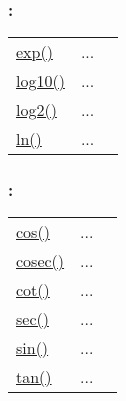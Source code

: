 \subsubsection*{: }

\textcolor{blue}{}\begin{tabular}{>{\raggedleft}p{3cm}>{\centering}p{0.5cm}l}
\textcolor{blue}{\hyperlink{exp}{exp()}}&
...&
 \begin{NoHyper} \nameref{par:Exponential-function} \end{NoHyper}\tabularnewline
\textcolor{blue}{\hyperlink{log10}{log10()}}&
...&
 \begin{NoHyper} \nameref{par:Decimal-logarithm} \end{NoHyper}\tabularnewline
\textcolor{blue}{\hyperlink{log2}{log2()}}&
...&
 \begin{NoHyper} \nameref{par:Binary-logarithm} \end{NoHyper}\tabularnewline
\textcolor{blue}{\hyperlink{ln}{ln()}}&
...&
 \begin{NoHyper} \nameref{par:Natural-logarithm} \end{NoHyper}\tabularnewline
\end{tabular}


\subsubsection*{: }

\textcolor{blue}{}\begin{tabular}{>{\raggedleft}p{3cm}>{\centering}p{0.5cm}l}
\textcolor{blue}{\hyperlink{cos}{cos()}}&
...&
 \begin{NoHyper} \nameref{par:Cosine} \end{NoHyper}\tabularnewline
\textcolor{blue}{\hyperlink{cosec}{cosec()}}&
...&
 \begin{NoHyper} \nameref{par:Cosecant} \end{NoHyper}\tabularnewline
\textcolor{blue}{\hyperlink{cot}{cot()}}&
...&
 \begin{NoHyper} \nameref{par:Cotangent} \end{NoHyper}\tabularnewline
\textcolor{blue}{\hyperlink{sec}{sec()}}&
...&
 \begin{NoHyper} \nameref{par:Secant} \end{NoHyper}\tabularnewline
\textcolor{blue}{\hyperlink{sin}{sin()}}&
...&
 \begin{NoHyper} \nameref{par:Sine} \end{NoHyper}\tabularnewline
\textcolor{blue}{\hyperlink{tan}{tan()}}&
...&
 \begin{NoHyper} \nameref{par:Tangent} \end{NoHyper}\tabularnewline
\end{tabular}


